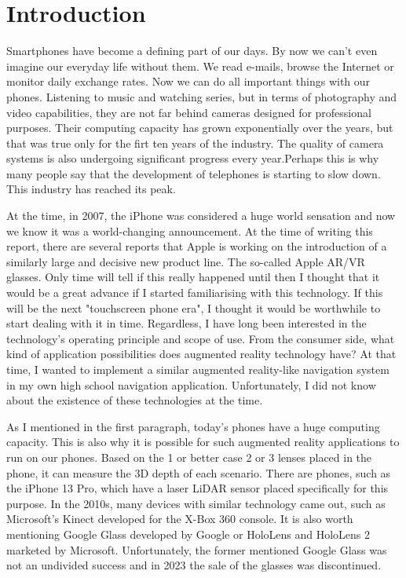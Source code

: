 \documentclass[a4paper,oneside]{article}
\begin{document}
\section{Introduction}
\label{sec:kornyezet}
\label{sec:bevezeto}


Smartphones have become a defining part of our days. By now we can't even imagine our everyday life without them. We read e-mails, browse the Internet or monitor daily exchange rates. Now we can do all important things with our phones. Listening to music and watching series, but in terms of photography and video capabilities, they are not far behind cameras designed for professional purposes. Their computing capacity has grown exponentially over the years, but that was true only for the firt ten years of the industry. The quality of camera systems is also undergoing significant progress every year.Perhaps this is why many people say that the development of telephones is starting to slow down. This industry has reached its peak.

At the time, in 2007, the iPhone was considered a huge world sensation and now we know it was a world-changing announcement. At the time of writing this report, there are several reports that Apple is working on the introduction of a similarly large and decisive new product line. The so-called Apple AR/VR glasses. Only time will tell if this really happened until then I thought that it would be a great advance if I started familiarising with this technology. If this will be the next "touchscreen phone era", I thought it would be worthwhile to start dealing with it in time. Regardless, I have long been interested in the technology's operating principle and scope of use. From the consumer side, what kind of application possibilities does augmented reality technology have? At that time, I wanted to implement a similar augmented reality-like navigation system in my own high school navigation application. Unfortunately, I did not know about the existence of these technologies at the time.

As I mentioned in the first paragraph, today's phones have a huge computing capacity. This is also why it is possible for such augmented reality applications to run on our phones. Based on the 1 or better case 2 or 3 lenses placed in the phone, it can measure the 3D depth of each scenario. There are phones, such as the iPhone 13 Pro, which have a laser LiDAR sensor placed specifically for this purpose. In the 2010s, many devices with similar technology came out, such as Microsoft's Kinect developed for the X-Box 360 console. It is also worth mentioning Google Glass developed by Google or HoloLens and HoloLens 2 marketed by Microsoft. Unfortunately, the former mentioned Google Glass was not an undivided success and in 2023 the sale of the glasses was discontinued.
\end{document}
